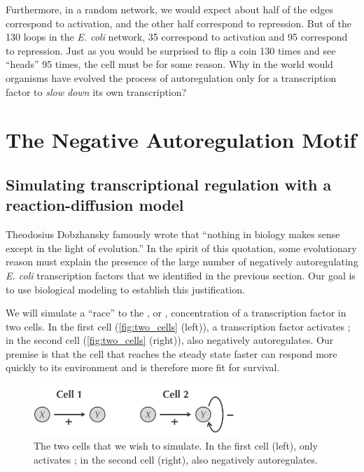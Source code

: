 Furthermore, in a random network, we would expect about half of the edges correspond to activation, and the other half correspond to repression. But of the 130 loops in the \textit{E. coli} network, 35 correspond to activation and 95 correspond to repression. Just as you would be surprised to flip a coin 130 times and see ``heads'' 95 times, the cell must be  for some reason. Why in the world would organisms have evolved the process of autoregulation only for a transcription factor to \textit{slow down} its own transcription?\\


\FloatBarrier
{}
\section{The Negative Autoregulation Motif}
\label{sec:the_negative_autoregulation_motif}

\subsection{Simulating transcriptional regulation with a reaction-diffusion model}

Theodosius Dobzhansky famously wrote that ``nothing in biology makes sense except in the light of evolution.'' In the spirit of this quotation, some evolutionary reason must explain the presence of the large number of negatively autoregulating \textit{E. coli} transcription factors that we identified in the previous section. Our goal is to use biological modeling to establish this justification.

We will simulate a ``race'' to the , or , concentration of a transcription factor  in two cells. In the first cell (\autoref{fig:two_cells} (left)), a transcription factor  activates ; in the second cell (\autoref{fig:two_cells} (right)),  also negatively autoregulates. Our premise is that the cell that reaches the steady state faster can respond more quickly to its environment and is therefore more fit for survival.\\

\begin{figure}[h]
\centering
\mySfFamily
\includegraphics[width = 0.7\textwidth]{../images/two_cells.png}
\caption{The two cells that we wish to simulate. In the first cell (left),  only activates ; in the second cell (right),  also negatively autoregulates.}
\label{fig:two_cells}
\end{figure}

